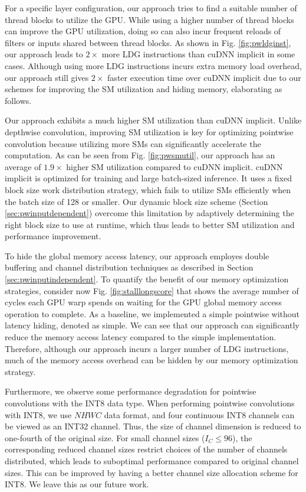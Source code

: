 For a specific layer configuration, our approach tries to find a suitable number of thread blocks to utilize the GPU. While using a higher
number of thread blocks can improve the GPU utilization, doing so can also incur frequent reloads of filters or inputs shared between
thread blocks. As shown in Fig. \ref{fig:pwldginst}, our approach leads to $2\times$ more LDG instructions than cuDNN implicit in some
cases. Although using more LDG instructions incurs extra memory load overhead, our approach still gives $2\times$ faster execution time
over cuDNN implicit due to our schemes for improving the SM utilization and hiding memory, elaborating as follows.


Our approach exhibits a much higher SM utilization than cuDNN implicit. Unlike depthwise convolution, improving SM utilization is key for
optimizing pointwise convolution because utilizing more SMs can significantly accelerate the computation.	As can be seen from Fig.
\ref{fig:pwsmutil}, our approach has an average of $1.9\times$ higher SM utilization compared to cuDNN implicit. cuDNN implicit is
optimized for training and large batch-sized inference. It uses a fixed block size work distribution strategy, which fails to utilize SMs
efficiently when the batch size of 128 or smaller. Our dynamic block size scheme (Section \ref{sec:pwinputdependent}) overcome this
limitation by adaptively determining the right block size to use at runtime, which thus leads to better SM utilization and performance
improvement.

To hide the global memory access latency, our approach employes double buffering and channel distribution techniques as described in
Section \ref{sec:pwinputindependent}. To quantify the benefit of our memory optimization strategies, consider now  Fig. \ref{fig:stalllongscore} that
shows the average number of cycles each GPU warp spends on waiting for the GPU global memory access operation to complete. As a baseline,
we implemented a simple pointwise without latency hiding, denoted as simple. We can see that our approach can significantly reduce the
memory access latency compared to the simple implementation. Therefore, although our approach incurs a larger number of LDG instructions,
much of the memory access overhead can be hidden by our memory optimization strategy.



Furthermore, we observe some performance degradation for pointwise convolutions with the INT8 data type. When performing pointwise
convolutions with INT8, we use $NHWC$ data format, and four continuous INT8 channels can be viewed as an INT32 channel. Thus, the size of
channel dimension is reduced to one-fourth of the original size. For small channel sizes ($I_C \leq 96$), the corresponding reduced channel
sizes restrict choices of the number of channels distributed, which leads to suboptimal performance compared to original channel sizes.
This can be improved by having a better channel size allocation scheme for INT8. We leave this as our future work.


